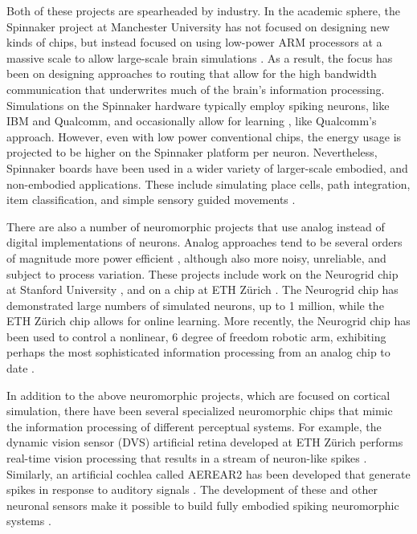 \documentclass[english]{article}
\begin{document}
Both of these projects are spearheaded by industry.  In the academic sphere, the Spinnaker project at Manchester University has not focused on designing new kinds of chips, but instead focused on using low-power ARM processors at a massive scale to allow large-scale brain simulations \cite{Khan2008}. As a result, the focus has been on designing approaches to routing that allow for the high bandwidth communication that underwrites much of the brain's information processing. Simulations on the Spinnaker hardware typically employ spiking neurons, like IBM and Qualcomm, and occasionally allow for learning \cite{davies2013spike}, like Qualcomm's approach. However, even with low power conventional chips, the energy usage is projected to be higher on the Spinnaker platform per neuron. Nevertheless, Spinnaker boards have been used in a wider variety of larger-scale embodied, and non-embodied applications. These include simulating place cells, path integration, item classification, and simple sensory guided movements \cite{Stewart2013a}.

There are also a number of neuromorphic projects that use analog instead of digital implementations of neurons. Analog approaches tend to be several orders of magnitude more power efficient \cite{hasler2013}, although also more noisy, unreliable, and subject to process variation. These projects include work on the Neurogrid chip at Stanford University \cite{Choudhary2012}, and on a chip at ETH Z\"{u}rich \cite{Corradi2014}. The Neurogrid chip has demonstrated large numbers of simulated neurons, up to 1 million, while the ETH Z\"{u}rich chip allows for online learning. More recently, the Neurogrid chip has been used to control a nonlinear, 6 degree of freedom robotic arm, exhibiting perhaps the most sophisticated information processing from an analog chip to date \cite{Menon14:biorob}. 

In addition to the above neuromorphic projects, which are focused on cortical simulation, there have been several specialized neuromorphic chips that mimic the information processing of different perceptual systems. For example, the dynamic vision sensor (DVS) artificial retina developed at ETH Z\"{u}rich performs real-time vision processing that results in a stream of neuron-like spikes \cite{Lichtsteiner2008}. Similarly, an artificial cochlea called AEREAR2 has been developed that generate spikes in response to auditory signals \cite{Li2012}. The development of these and other neuronal sensors make it possible to build fully embodied spiking neuromorphic systems \cite{Galluppi2014}. 
\end{document}
